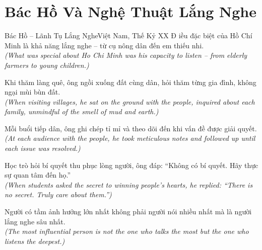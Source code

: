 \section{Bác Hồ Và Nghệ Thuật Lắng Nghe}
\begin{truyen}{Bác Hồ -- Lãnh Tụ Lắng Nghe}{Việt Nam, Thế Kỷ XX}
Đ iều đặc biệt của Hồ Chí Minh là khả năng lắng nghe -- từ cụ nông dân đến em thiếu nhi.\\
\textit{(What was special about Ho Chi Minh was his capacity to listen -- from elderly farmers to young children.)}

Khi thăm làng quê, ông ngồi xuống đất cùng dân, hỏi thăm từng gia đình, không ngại mùi bùn đất.\\
\textit{(When visiting villages, he sat on the ground with the people, inquired about each family, unmindful of the smell of mud and earth.)}

Mỗi buổi tiếp dân, ông ghi chép tỉ mỉ và theo dõi đến khi vấn đề được giải quyết.\\
\textit{(At each audience with the people, he took meticulous notes and followed up until each issue was resolved.)}

Học trò hỏi bí quyết thu phục lòng người, ông đáp: ``Không có bí quyết. Hãy thực sự quan tâm đến họ.''\\
\textit{(When students asked the secret to winning people's hearts, he replied: ``There is no secret. Truly care about them.'')}

\end{truyen}
\begin{baihoc}
  Người có tầm ảnh hưởng lớn nhất không phải người nói nhiều nhất mà là người lắng nghe sâu nhất.\\
  \textit{(The most influential person is not the one who talks the most but the one who listens the deepest.)}
\end{baihoc}

